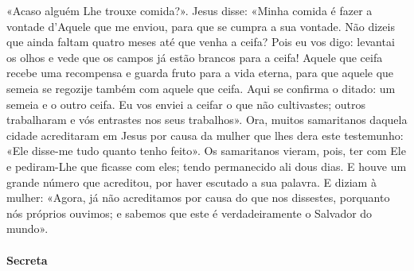 \begin{paracol}{2}
{«Acaso alguém Lhe trouxe comida?». Jesus disse: «Minha comida é fazer a vontade d’Aquele que me enviou, para que se cumpra a sua vontade. Não dizeis que ainda faltam quatro meses até que venha a ceifa? Pois eu vos digo: levantai os olhos e vede que os campos já estão brancos para a ceifa! Aquele que ceifa recebe uma recompensa e guarda fruto para a vida eterna, para que aquele que semeia se regozije também com aquele que ceifa. Aqui se confirma o ditado: um semeia e o outro ceifa. Eu vos enviei a ceifar o que não cultivastes; outros trabalharam e vós entrastes nos seus trabalhos». Ora, muitos samaritanos daquela cidade acreditaram em Jesus por causa da mulher que lhes dera este testemunho: «Ele disse-me tudo quanto tenho feito». Os samaritanos vieram, pois, ter com Ele e pediram-Lhe que ficasse com eles; tendo permanecido ali dous dias. E houve um grande número que acreditou, por haver escutado a sua palavra. E diziam à mulher: «Agora, já não acreditamos por causa do que nos dissestes, porquanto nós próprios ouvimos; e sabemos que este é verdadeiramente o Salvador do mundo».
}\end{paracol}

\begin{paracol}{2}\switchcolumn{}\end{paracol}

\paragraph{Secreta}
\begin{paracol}{2}\switchcolumn{}\end{paracol}

\begin{paracol}{2}\switchcolumn{}\end{paracol}

